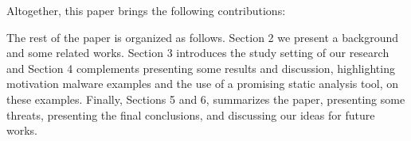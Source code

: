 Altogether, this paper brings the following contributions:


The rest of the paper is organized as follows. Section 2 we present a background and some related works. Section 3 introduces the study setting of our research and Section 4 complements presenting some results and discussion, highlighting motivation malware examples and the use of a promising static analysis tool, on these examples. Finally, Sections 5 and 6, summarizes the paper, presenting some threats, presenting the final conclusions, and discussing our ideas for future works.



 
 
 
 
